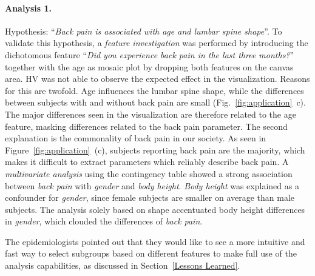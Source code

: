 \documentclass[journal]{style/vgtc} 			          %
\begin{document}
\paragraph{Analysis 1.}
Hypothesis: ``\emph{Back pain is associated with age and lumbar spine shape}''.
%
To validate this hypothesis, a \emph{feature investigation} was performed by introducing the dichotomous feature ``\emph{Did you experience back pain in the last three months?}'' together with the age as mosaic plot by dropping both features on the canvas area.
%
HV was not able to observe the expected effect in the visualization.
%
Reasons for this are twofold.
%
Age influences the lumbar spine shape, while the differences between subjects with and without back pain are small (Fig.~\ref{fig:application}~c).
%
The major differences seen in the visualization are therefore related to the age feature, masking differences related to the back pain parameter.
%
The second explanation is the commonality of back pain in our society.
%
As seen in Figure~\ref{fig:application}~(c), subjects reporting back pain are the majority, which makes it difficult to extract parameters which reliably describe back pain.
%
A \emph{multivariate analysis} using the contingency table showed a strong association between \emph{back pain} with \emph{gender} and \emph{body height}.
%
\emph{Body height} was explained as a confounder for \emph{gender}, since female subjects are smaller on average than male subjects.
%
The analysis solely based on shape accentuated body height differences in \emph{gender}, which clouded the differences of \emph{back pain}.
%

The epidemiologists pointed out that they would like to see a more intuitive and fast way to select subgroups based on different features to make full use of the analysis capabilities, as discussed in Section~\ref{Lessons Learned}.
\end{document}
